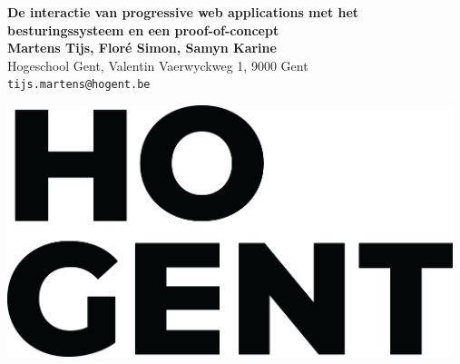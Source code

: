 \documentclass[a0,portrait]{a0poster}
\begin{document}
\begin{minipage}[t]{0.75\linewidth}
\VeryHuge \color{HoGentAccent1} \textbf{De interactie van progressive web applications met het besturingssysteem en een proof-of-concept} \color{Black}\\ %
\huge \textbf{Martens Tijs, Floré Simon, Samyn Karine}\\[0.5cm] %
\huge Hogeschool Gent, Valentin Vaerwyckweg 1, 9000 Gent\\[0.4cm] %
\Large \texttt{tijs.martens@hogent.be} \\
\end{minipage}
%
\begin{minipage}[t]{0.25\linewidth}
\includegraphics[width=13cm,right]{figures/HOGENT_Logo_Pos_rgb.png} 

\end{minipage}

\vspace{1cm}

\end{document}
